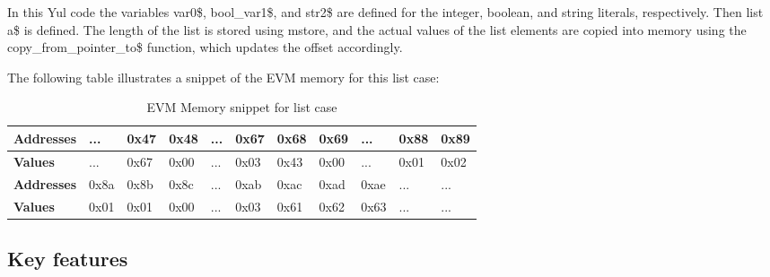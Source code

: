 In this Yul code the variables var0\$, bool\_var1\$, and str2\$ are defined for the integer, boolean, and string literals, respectively. Then list a\$ is defined. The length of the list is stored using mstore, and the actual values of the list elements are copied into memory using the copy\_from\_pointer\_to\$ function, which updates the offset accordingly.

The following table illustrates a snippet of the EVM memory for this list case:
\begin{table}[h!]
  \centering
  \renewcommand{\arraystretch}{1.2} %
  \begin{tabular}{|>{\centering\arraybackslash}m{3cm}|>{\centering\arraybackslash}m{1cm}|>{\centering\arraybackslash}m{1cm}|>{\centering\arraybackslash}m{1cm}|>{\centering\arraybackslash}m{1cm}|>{\centering\arraybackslash}m{1cm}|>{\centering\arraybackslash}m{1cm}|>{\centering\arraybackslash}m{1cm}|>{\centering\arraybackslash}m{1cm}|>{\centering\arraybackslash}m{1cm}|>{\centering\arraybackslash}m{1cm}|}
  \hline
  \textbf{Addresses} & ... & 0x47 & 0x48 & ... & 0x67 & 0x68 & 0x69 & ... & 0x88 & 0x89 \\ \hline
  \textbf{Values}    & ... & 0x67 & 0x00 & ... & 0x03 & 0x43 & 0x00 & ... & 0x01 & 0x02 \\ \hline \hline
  \textbf{Addresses} & 0x8a & 0x8b & 0x8c & ... & 0xab & 0xac & 0xad & 0xae & ... & ... \\ \hline
  \textbf{Values}    & 0x01 & 0x01 & 0x00 & ... & 0x03 & 0x61 & 0x62 & 0x63 & ... & ... \\ \hline
  \end{tabular}
  \caption{EVM Memory snippet for list case}
  \label{tab:evm_memory_aux} 
  \end{table}

\subsection{Key features}
\label{sec:key_features}

